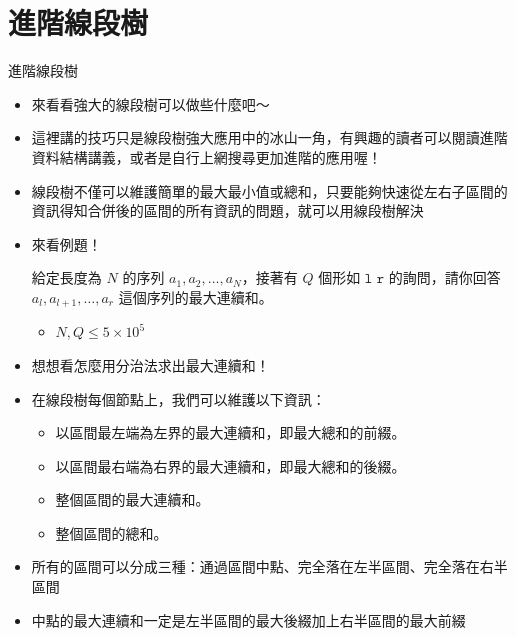\documentclass[standalone]{beamer}
\begin{document}
\section{進階線段樹}

\begin{frame}[fragile]{進階線段樹}
  \begin{itemize}
    \item 來看看強大的線段樹可以做些什麼吧～
    \item 這裡講的技巧只是線段樹強大應用中的冰山一角，有興趣的讀者可以閱讀進階資料結構講義，或者是自行上網搜尋更加進階的應用喔！
  \end{itemize}
\end{frame}

\begin{frame}[fragile]{}
  \begin{itemize}
    \item 線段樹不僅可以維護簡單的最大最小值或總和，只要能夠快速從左右子區間的資訊得知合併後的區間的所有資訊的問題，就可以用線段樹解決
    \item 來看例題！
    \begin{problem}[區間最大連續和]
      給定長度為 \(N\) 的序列 \(a_1, a_2, \dots, a_N\)，接著有 \(Q\) 個形如 \(\texttt{l r}\) 的詢問，請你回答 \(a_l, a_{l+1}, \dots, a_r\) 這個序列的最大連續和。

      \begin{itemize}
          \item
              \(N, Q \leq 5 \times 10^5\)
      \end{itemize}
    \end{problem}
  \end{itemize}
\end{frame}

\begin{frame}[fragile]{}
  \begin{itemize}
    \item 想想看怎麼用分治法求出最大連續和！
    \item 在線段樹每個節點上，我們可以維護以下資訊：
      \begin{itemize}
          \item 以區間最左端為左界的最大連續和，即最大總和的前綴。
          \item 以區間最右端為右界的最大連續和，即最大總和的後綴。
          \item 整個區間的最大連續和。
          \item 整個區間的總和。
      \end{itemize}
    \item 所有的區間可以分成三種：通過區間中點、完全落在左半區間、完全落在右半區間
    \item 中點的最大連續和一定是左半區間的最大後綴加上右半區間的最大前綴
  \end{itemize}
\end{frame}
\end{document}

